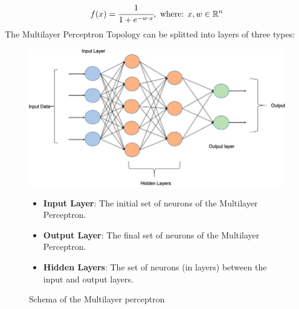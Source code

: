 \documentclass[a4paper, 11pt]{article}
\begin{document}
\begin{equation*}
    f(x) = \cfrac{1}{1+e^{-w\cdot x}},\text{ where: } x,w\in\mathbb{R}^n
\end{equation*}
The Multilayer Perceptron Topology can be splitted into layers of three types:
\begin{figure}[h]
    \begin{minipage}{9cm}
        \includegraphics[width = 1 \textwidth]{Neural_Network/Multi-layer-perceptron-MLP-NN-basic-Architecture.png}
        \caption{Schema of the Multilayer perceptron}
    \end{minipage}
    \hspace{1em}
    \begin{minipage}{5cm}
        \begin{itemize}
            \item \textbf{Input Layer}: The initial set of neurons of the Multilayer Perceptron.
            \item \textbf{Output Layer}: The final set of neurons of the Multilayer Perceptron.
            \item \textbf{Hidden Layers}: The set of neurons (in layers) between the input and output layers.
        \end{itemize}
    \end{minipage}
\end{figure}\\
\newpage






\end{document}
